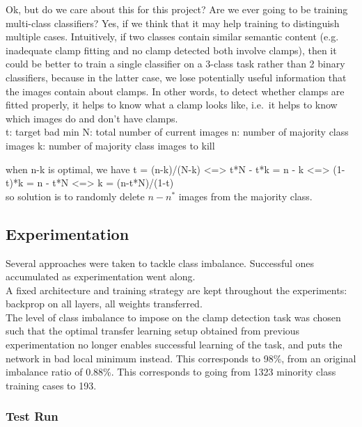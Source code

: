 \documentclass[a4paper,11pt]{article}
\begin{document}
Ok, but do we care about this for this project? Are we ever going to be training multi-class classifiers? Yes, if we think that it may help training to distinguish multiple cases. Intuitively, if two classes contain similar semantic content (e.g. inadequate clamp fitting and no clamp detected both involve clamps), then it could be better to train a single classifier on a 3-class task rather than 2 binary classifiers, because in the latter case, we lose potentially useful information that the images contain about clamps. In other words, to detect whether clamps are fitted properly, it helps to know what a clamp looks like, i.e.\ it helps to know which images do and don't have clamps. \\

t: target bad min
N: total number of current images
n: number of majority class images
k: number of majority class images to kill

when n-k is optimal, we have t = (n-k)/(N-k)
<=> t*N - t*k = n - k
<=> (1-t)*k = n - t*N
<=> k = (n-t*N)/(1-t) \\

so solution is to randomly delete $n - n^{*}$ images from the majority class. \\

\subsection{Experimentation}

Several approaches were taken to tackle class imbalance. Successful ones accumulated as experimentation went along. \\

A fixed architecture and training strategy are kept throughout the experiments: backprop on all layers, all weights transferred. \\

The level of class imbalance to impose on the clamp detection task was chosen such that the optimal transfer learning setup obtained from previous experimentation no longer enables successful learning of the task, and puts the network in bad local minimum instead. This corresponds to 98\%, from an original imbalance ratio of 0.88\%. This corresponds to going from 1323 minority class training cases to 193. \\

\subsubsection{Test Run}
\end{document}
